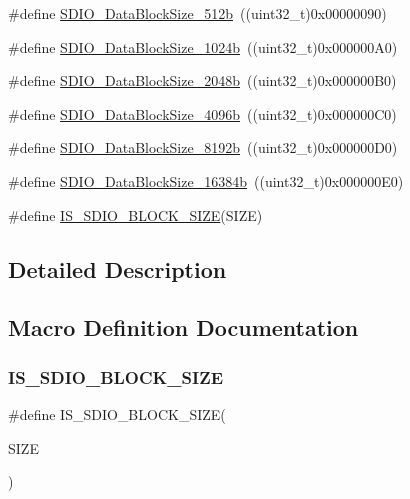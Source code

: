 \begin{DoxyCompactItemize}
\item 
\#define \mbox{\hyperlink{group___s_d_i_o___data___block___size_gaa619848f7700962c5b7065f43e286e0b}{S\+D\+I\+O\+\_\+\+Data\+Block\+Size\+\_\+512b}}~((uint32\+\_\+t)0x00000090)
\item 
\#define \mbox{\hyperlink{group___s_d_i_o___data___block___size_ga7dad3c1c33e63a00eb6301b0a1135baf}{S\+D\+I\+O\+\_\+\+Data\+Block\+Size\+\_\+1024b}}~((uint32\+\_\+t)0x000000\+A0)
\item 
\#define \mbox{\hyperlink{group___s_d_i_o___data___block___size_ga41eb937621c7ffcf2688c6bc0ea31464}{S\+D\+I\+O\+\_\+\+Data\+Block\+Size\+\_\+2048b}}~((uint32\+\_\+t)0x000000\+B0)
\item 
\#define \mbox{\hyperlink{group___s_d_i_o___data___block___size_ga360411488abdbaf9eee9b99fca793f79}{S\+D\+I\+O\+\_\+\+Data\+Block\+Size\+\_\+4096b}}~((uint32\+\_\+t)0x000000\+C0)
\item 
\#define \mbox{\hyperlink{group___s_d_i_o___data___block___size_gaf61913f3eff52c0f728db9ffbdaca7d2}{S\+D\+I\+O\+\_\+\+Data\+Block\+Size\+\_\+8192b}}~((uint32\+\_\+t)0x000000\+D0)
\item 
\#define \mbox{\hyperlink{group___s_d_i_o___data___block___size_gae80bc49dbed677f7087d523c31fe10ae}{S\+D\+I\+O\+\_\+\+Data\+Block\+Size\+\_\+16384b}}~((uint32\+\_\+t)0x000000\+E0)
\item 
\#define \mbox{\hyperlink{group___s_d_i_o___data___block___size_ga25ce8d64134659c479d61aa681761948}{I\+S\+\_\+\+S\+D\+I\+O\+\_\+\+B\+L\+O\+C\+K\+\_\+\+S\+I\+ZE}}(S\+I\+ZE)
\end{DoxyCompactItemize}


\subsection{Detailed Description}


\subsection{Macro Definition Documentation}
\mbox{\label{group___s_d_i_o___data___block___size_ga25ce8d64134659c479d61aa681761948}} 
\subsubsection{\texorpdfstring{IS\_SDIO\_BLOCK\_SIZE}{IS\_SDIO\_BLOCK\_SIZE}}
{\footnotesize\ttfamily \#define I\+S\+\_\+\+S\+D\+I\+O\+\_\+\+B\+L\+O\+C\+K\+\_\+\+S\+I\+ZE(\begin{DoxyParamCaption}\item[{}]{S\+I\+ZE }\end{DoxyParamCaption})}

